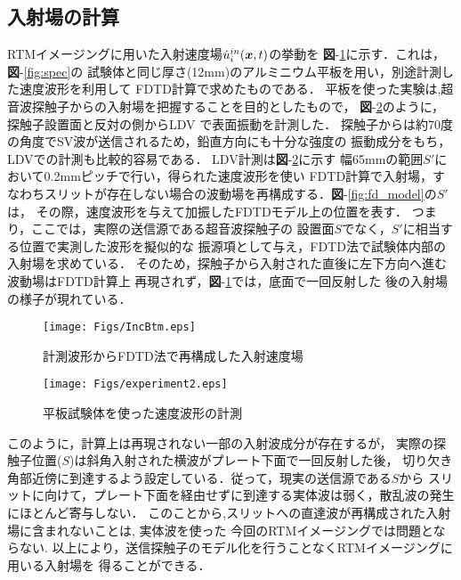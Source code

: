 \subsection{入射場の計算}
RTMイメージングに用いた入射速度場$\dot{u}_i^{in}(\boldsymbol{x},t)$の挙動を
{\bf 図}-\ref{fig:inc_btm}に示す．これは，{\bf 図}-\ref{fig:spec}の
試験体と同じ厚さ(12mm)のアルミニウム平板を用い，別途計測した速度波形を利用して
FDTD計算で求めたものである．
平板を使った実験は,超音波探触子からの入射場を把握することを目的としたもので，
{\bf 図}-\ref{fig:experiment2}のように，探触子設置面と反対の側からLDV
で表面振動を計測した．
%
探触子からは約70度の角度でSV波が送信されるため，鉛直方向にも十分な強度の
振動成分をもち，LDVでの計測も比較的容易である．
%
LDV計測は{\bf 図}-\ref{fig:experiment2}に示す
幅65mmの範囲$S'$において0.2mmピッチで行い，得られた速度波形を使い
FDTD計算で入射場，すなわちスリットが存在しない場合の波動場を再構成する．{\bf 図}-\ref{fig:fd_model}の$S'$は，
その際，速度波形を与えて加振したFDTDモデル上の位置を表す．
つまり，ここでは，実際の送信源である超音波探触子の
設置面$S$でなく，$S'$に相当する位置で実測した波形を擬似的な
振源項として与え，FDTD法で試験体内部の入射場を求めている．
そのため，探触子から入射された直後に左下方向へ進む波動場はFDTD計算上
再現されず，{\bf 図}-\ref{fig:inc_btm}では，底面で一回反射した
後の入射場の様子が現れている．
\begin{figure}[thb]
\centering
	\texttt{[image: Figs/IncBtm.eps]}
	\caption{計測波形からFDTD法で再構成した入射速度場}
	\label{fig:inc_btm}
\end{figure}
\begin{figure}[hbt]
\centering
	\texttt{[image: Figs/experiment2.eps]}
	\caption{平板試験体を使った速度波形の計測}
	\label{fig:experiment2}
\end{figure}
このように，計算上は再現されない一部の入射波成分が存在するが，
実際の探触子位置($S$)は斜角入射された横波がプレート下面で一回反射した後，
切り欠き角部近傍に到達するよう設定している．従って，現実の送信源である$S$から
スリットに向けて，プレート下面を経由せずに到達する実体波は弱く，散乱波の発生にほとんど寄与しない．
このことから,スリットへの直達波が再構成された入射場に含まれないことは,
%
実体波を使った
%
今回のRTMイメージングでは問題とならない.
以上により，送信探触子のモデル化を行うことなくRTMイメージングに用いる入射場を
得ることができる．
